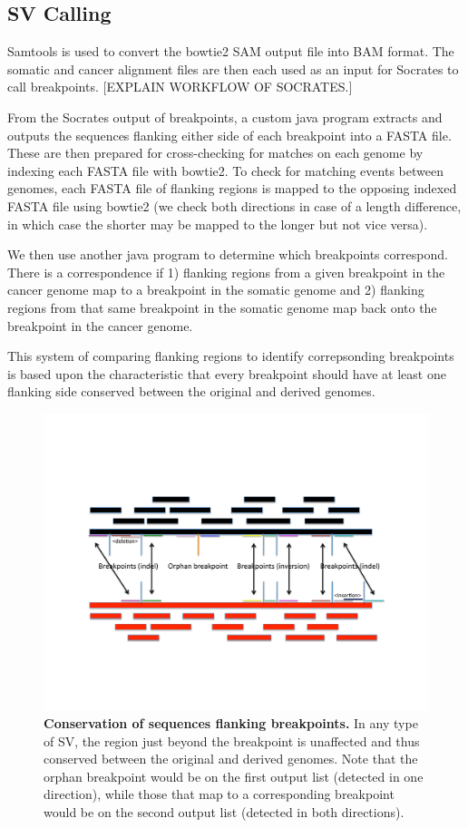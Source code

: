 \documentclass{easychithesis}
\begin{document}
\subsection{SV Calling}
Samtools is used to convert the bowtie2 SAM output file into BAM format. The somatic and cancer alignment files are then each used as an input for Socrates to call breakpoints. [EXPLAIN WORKFLOW OF SOCRATES.]

From the Socrates output of breakpoints, a custom java program extracts and outputs the sequences flanking either side of each breakpoint into a FASTA file. These are then prepared for cross-checking for matches on each genome by indexing each FASTA file with bowtie2. To check for matching events between genomes, each FASTA file of flanking regions is mapped to the opposing indexed FASTA file using bowtie2 (we check both directions in case of a length difference, in which case the shorter may be mapped to the longer but not vice versa).

We then use another java program to determine which breakpoints correspond. There is a correspondence if 1) flanking regions from a given breakpoint in the cancer genome map to a breakpoint in the somatic genome and 2) flanking regions from that same breakpoint in the somatic genome map back onto the breakpoint in the cancer genome.

This system of comparing flanking regions to identify correpsonding breakpoints is based upon the characteristic that every breakpoint should have at least one flanking side conserved between the original and derived genomes.

\begin{figure}[!ht]
\begin{center}
\includegraphics[width = 0.95  \linewidth]{../Code/Figures/FlankConservation.pdf}
\end{center}
\caption{{\bf Conservation of sequences flanking breakpoints.} In any type of SV, the region just beyond the breakpoint is unaffected and thus conserved between the original and derived genomes. Note that the orphan breakpoint would be on the first output list (detected in one direction), while those that map to a corresponding breakpoint would be on the second output list (detected in both directions).}
\label{fig:FlankConservation}
\end{figure}
\end{document}
